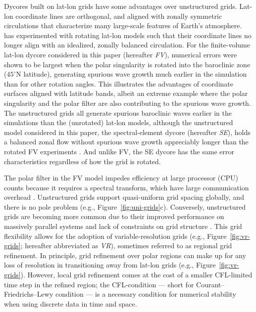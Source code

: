 \documentclass[draft]{agujournal2019}
\begin{document}
Dycores built on lat-lon grids have some advantages over unstructured grids. Lat-lon coordinate lines are orthogonal, and aligned with zonally symmetric circulations that characterize many large-scale features of Earth's atmosphere.  has experimented with rotating lat-lon models such that their coordinate lines no longer align with an idealized, zonally balanced circulation. For the finite-volume lat-lon dycore considered in this paper (hereafter \textit{FV}), numerical errors were shown to be largest when the polar singularity is rotated into the baroclinic zone ($45^{\circ}$N latitude), generating spurious wave growth much earlier in the simulation than for other rotation angles. This illustrates the advantages of coordinate surfaces aligned with latitude bands, albeit an extreme example where the polar singularity and the polar filter are also contributing to the spurious wave growth. The unstructured grids all generate spurious baroclinic waves earlier in the simulations than the (unrotated) lat-lon models, although the unstructured model considered in this paper, the spectral-element dycore (hereafter \textit{SE}), holds a balanced zonal flow without spurious wave growth appreciably longer than the rotated FV experiments \cite{LJTN2010JAMES}. And unlike FV, the SE dycore has the same error characteristics regardless of how the grid is rotated.

The polar filter in the FV model impedes efficiency at large processor (CPU) counts because it requires a spectral transform, which have large communication overhead \cite{ST1995GEOS,DetAl2012IJHPCA}. Unstructured grids support quasi-uniform grid spacing globally, and there is no pole problem (e.g., Figure~\ref{fig:uni-grids}c). Conversely, unstructured grids are becoming more common due to their improved performance on massively parallel systems and lack of constraints on grid structure \cite{TTI1997JCP,PL2007JCP,WETAL2013GMD}. This grid flexibility allows for the adoption of variable-resolution grids (e.g., Figure~\ref{fig:vr-grids}; hereafter abbreviated as \textit{VR}), sometimes referred to as regional grid refinement. In principle, grid refinement over polar regions can make up for any loss of resolution in transitioning away from lat-lon grids (e.g., Figure~\ref{fig:vr-grids}).  However, local grid refinement comes at the cost of a smaller CFL-limited time step in the refined region; the CFL-condition --- short for Courant–Friedrichs–Lewy condition --- is a necessary condition for numerical stability when using discrete data in time and space.
\end{document}
